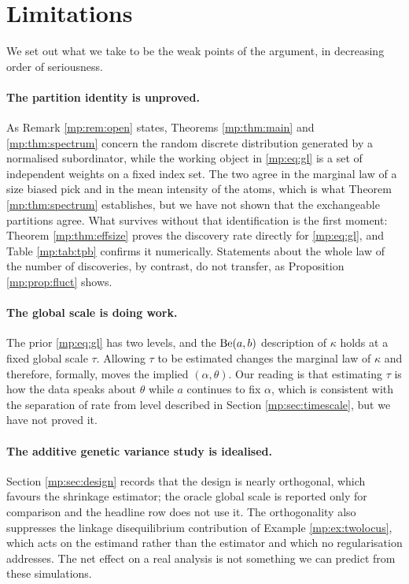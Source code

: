 \section{Limitations}
\label{mp:sec:limits}

We set out what we take to be the weak points of the argument, in decreasing order of
seriousness.

\paragraph{The partition identity is unproved.} As Remark \ref{mp:rem:open} states, Theorems
\ref{mp:thm:main} and \ref{mp:thm:spectrum} concern the random discrete distribution generated by
a normalised subordinator, while the working object in \eqref{mp:eq:gl} is a set of independent
weights on a fixed index set. The two agree in the marginal law of a size biased pick and in
the mean intensity of the atoms, which is what Theorem \ref{mp:thm:spectrum} establishes, but
we have not shown that the exchangeable partitions agree. What survives without that
identification is the first moment: Theorem \ref{mp:thm:effsize} proves the discovery rate
directly for \eqref{mp:eq:gl}, and Table \ref{mp:tab:tpb} confirms it numerically. Statements
about the whole law of the number of discoveries, by contrast, do not transfer, as
Proposition \ref{mp:prop:fluct} shows.

\paragraph{The global scale is doing work.} The prior \eqref{mp:eq:gl} has two levels, and the
$\mathrm{Be}(a,b)$ description of $\kappa$ holds at a fixed global scale $\tau$. Allowing $\tau$ to
be estimated changes the marginal law of $\kappa$ and therefore, formally, moves the implied
$(\alpha,\theta)$. Our reading is that estimating $\tau$ is how the data speaks about
$\theta$ while $a$ continues to fix $\alpha$, which is consistent with the separation of rate
from level described in Section \ref{mp:sec:timescale}, but we have not proved it.

\paragraph{The additive genetic variance study is idealised.} Section \ref{mp:sec:design}
records that the design is nearly orthogonal, which favours the shrinkage estimator; the
oracle global scale is reported only for comparison and the headline row does not use it.
The orthogonality also suppresses the linkage
disequilibrium contribution of Example \ref{mp:ex:twolocus}, which acts on the estimand rather
than the estimator and which no regularisation addresses. The net effect on a real analysis
is not something we can predict from these simulations.


